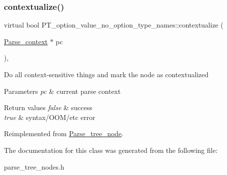 \subsubsection{\texorpdfstring{contextualize()}{contextualize()}}
{\footnotesize\ttfamily virtual bool P\+T\+\_\+option\+\_\+value\+\_\+no\+\_\+option\+\_\+type\+\_\+names\+::contextualize (\begin{DoxyParamCaption}\item[{\mbox{\hyperlink{structParse__context}{Parse\+\_\+context}} $\ast$}]{pc }\end{DoxyParamCaption})\hspace{0.3cm}{\ttfamily [inline]}, {\ttfamily [virtual]}}

Do all context-\/sensitive things and mark the node as contextualized


\begin{DoxyParams}{Parameters}
{\em pc} & current parse context\\
\hline
\end{DoxyParams}

\begin{DoxyRetVals}{Return values}
{\em false} & success \\
\hline
{\em true} & syntax/\+O\+O\+M/etc error \\
\hline
\end{DoxyRetVals}


Reimplemented from \mbox{\hyperlink{classParse__tree__node_a22d93524a537d0df652d7efa144f23da}{Parse\+\_\+tree\+\_\+node}}.



The documentation for this class was generated from the following file\+:\begin{DoxyCompactItemize}
\item 
parse\+\_\+tree\+\_\+nodes.\+h\end{DoxyCompactItemize}
